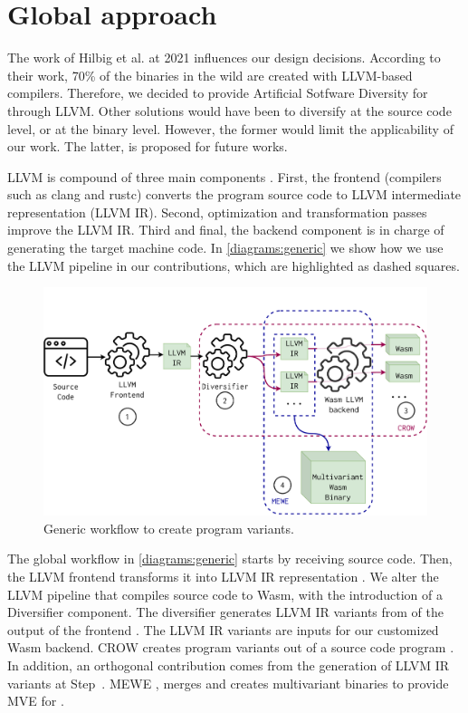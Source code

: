 \section{Global approach}
\label{tech:generic}

The work of Hilbig et al. \cite{Hilbig2021AnES} at 2021 influences our design decisions. According to their work, 70\% of the \wasm binaries in the wild are created with LLVM-based compilers. Therefore, we decided to provide Artificial Sotfware Diversity for \wasm through LLVM. 
Other solutions would have been to diversify at the source code level, or at the \wasm binary level. However, the former would limit the applicability of our work. The latter, is proposed for future works.

LLVM is compound of three main components \cite{llvmofficialweb}. First, the frontend (compilers such as clang and rustc) converts the program source code to LLVM intermediate representation (LLVM IR). Second, optimization and transformation passes improve the LLVM IR. Third and final, the backend component is in charge of generating the target machine code. In \autoref{diagrams:generic} we show how we use the LLVM pipeline in our contributions, which are highlighted as dashed squares.

\begin{figure}[h]
    \includegraphics[width=\linewidth]{diagrams/architecture.pdf}
    \caption{Generic workflow to create \wasm program variants.}
    \label{diagrams:generic}
\end{figure}


The global workflow in \autoref{diagrams:generic} starts by receiving source code. Then, the LLVM frontend transforms it into LLVM IR representation . We alter the LLVM pipeline that compiles source code to Wasm, with the introduction of a Diversifier component.  
The diversifier generates LLVM IR variants from of the output of the frontend . 
The LLVM IR variants are inputs for our customized Wasm  backend. 
CROW creates \wasm program variants out of a source code program . 
In addition, an orthogonal contribution comes from the generation of LLVM IR variants at Step~. MEWE  \cite{MEWE}, merges and creates multivariant binaries to provide MVE for \wasm {}. 

